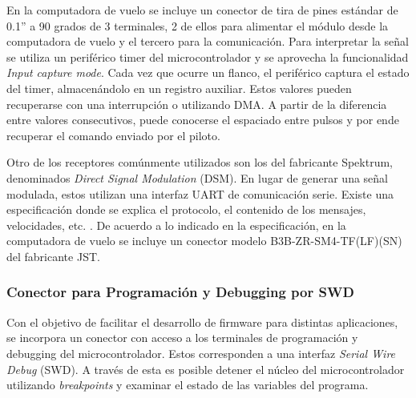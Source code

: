 En la computadora de vuelo se incluye un conector de tira de pines
estándar de 0.1” a 90 grados de 3 terminales, 2 de ellos para alimentar el módulo desde la computadora de vuelo y el tercero para la comunicación. Para interpretar la señal se utiliza un periférico timer del microcontrolador y se aprovecha la funcionalidad \textit{Input capture mode}. Cada vez que ocurre un flanco, el periférico captura el estado del timer, almacenándolo en un registro auxiliar. Estos valores pueden recuperarse con una interrupción o utilizando DMA. A partir de la diferencia entre valores consecutivos, puede conocerse el espaciado entre pulsos y por ende recuperar el comando enviado por el piloto.





Otro de los receptores comúnmente utilizados son los del fabricante Spektrum, denominados \textit{Direct Signal Modulation} (DSM). En lugar de generar una señal modulada, estos utilizan una interfaz UART de comunicación serie. Existe una especificación donde se explica el protocolo, el contenido de los mensajes, velocidades, etc. \cite{Spektrum_spec}. De acuerdo a lo indicado en la especificación, en la computadora de vuelo se incluye un conector modelo B3B-ZR-SM4-TF(LF)(SN) del fabricante JST. 



\subsubsection{Conector para Programación y Debugging por SWD}

Con el objetivo de facilitar el desarrollo de firmware para distintas aplicaciones, se incorpora un conector con acceso a los terminales de programación y debugging del microcontrolador. Estos corresponden a una interfaz \textit{Serial Wire Debug} (SWD). A través de esta es posible detener el núcleo del microcontrolador utilizando \textit{breakpoints} y examinar el estado de las variables del programa.

